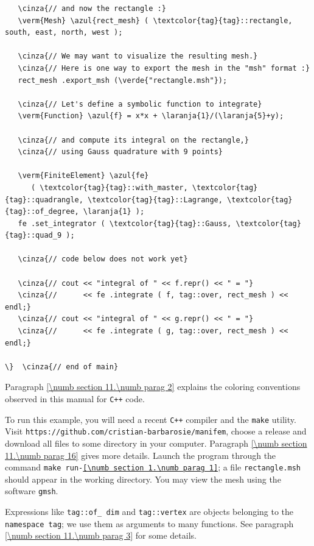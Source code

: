 \begin{Verbatim}
   \cinza{// and now the rectangle :}
   \verm{Mesh} \azul{rect_mesh} ( \textcolor{tag}{tag}::rectangle, south, east, north, west );

   \cinza{// We may want to visualize the resulting mesh.}
   \cinza{// Here is one way to export the mesh in the "msh" format :}
   rect_mesh .export_msh (\verde{"rectangle.msh"});

   \cinza{// Let's define a symbolic function to integrate}
   \verm{Function} \azul{f} = x*x + \laranja{1}/(\laranja{5}+y);

   \cinza{// and compute its integral on the rectangle,}
   \cinza{// using Gauss quadrature with 9 points}

   \verm{FiniteElement} \azul{fe}
      ( \textcolor{tag}{tag}::with_master, \textcolor{tag}{tag}::quadrangle, \textcolor{tag}{tag}::Lagrange, \textcolor{tag}{tag}::of_degree, \laranja{1} );
   fe .set_integrator ( \textcolor{tag}{tag}::Gauss, \textcolor{tag}{tag}::quad_9 );

   \cinza{// code below does not work yet}

   \cinza{// cout << "integral of " << f.repr() << " = "}
   \cinza{//      << fe .integrate ( f, tag::over, rect_mesh ) << endl;}
   \cinza{// cout << "integral of " << g.repr() << " = "}
   \cinza{//      << fe .integrate ( g, tag::over, rect_mesh ) << endl;}

\}  \cinza{// end of main}
\end{Verbatim}

Paragraph \ref{\numb section 11.\numb parag 2} explains the coloring conventions observed
in this manual for {\tt C++} code.

To run this example, you will need a recent {\tt C++} compiler and the {\tt make} utility.
Visit {\small\tt https://github.com/cristian-barbarosie/manifem}, choose a release
and download all files to some directory in your computer.
Paragraph \ref{\numb section 11.\numb parag 16} gives more details.
Launch the program through the command
{\small\tt make run-\ref{\numb section 1.\numb parag 1}};
a file {\small\tt rectangle.msh} should appear in the working directory.
You may view the mesh using the software {\tt gmsh}.

Expressions like {\small\tt \textcolor{tag}{tag}::of\_\,dim} and {\small\tt \textcolor{tag}{tag}::vertex} are
objects belonging to the {\small\tt namespace \textcolor{tag}{tag}};
we use them as arguments to many functions.
See paragraph \ref{\numb section 11.\numb parag 3} for some details.

